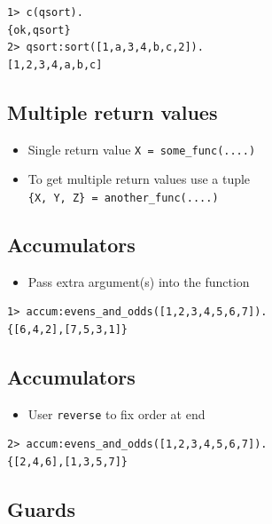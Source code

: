 \documentclass[12pt]{article}
\begin{document}


\begin{verbatim}
1> c(qsort).                  
{ok,qsort}
2> qsort:sort([1,a,3,4,b,c,2]). 
[1,2,3,4,a,b,c]
\end{verbatim}

\subsection{Multiple return values}

\begin{itemize}
\item Single return value \verb+X = some_func(....)+
\item To get multiple return values use a tuple\\
  \verb+{X, Y, Z} = another_func(....)+ 
\end{itemize}

\subsection{Accumulators}
\begin{itemize}
\item Pass extra argument(s) into the function
\end{itemize}



\begin{verbatim}
1> accum:evens_and_odds([1,2,3,4,5,6,7]).
{[6,4,2],[7,5,3,1]}
\end{verbatim}

\subsection{Accumulators}
\begin{itemize}
\item User \verb+reverse+ to fix order at end
\end{itemize}



\begin{verbatim}
2> accum:evens_and_odds([1,2,3,4,5,6,7]).
{[2,4,6],[1,3,5,7]}
\end{verbatim}

\subsection{Guards}
\end{document}

